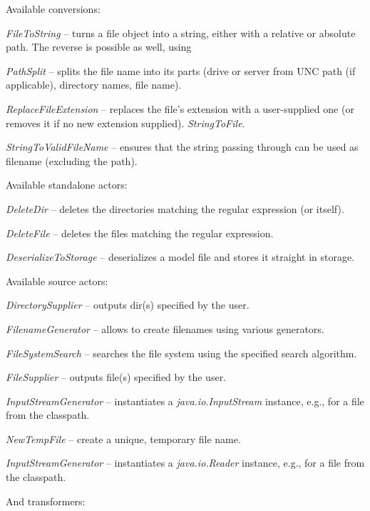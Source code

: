 Available conversions:
\begin{tight_itemize}
	\item \textit{FileToString} -- turns a file object into a string, either with a 
	relative or absolute path. The reverse is possible as well, using
	\item \textit{PathSplit} -- splits the file name into its parts (drive or
	server from UNC path (if applicable), directory names, file name).
	\item \textit{ReplaceFileExtension} -- replaces the file's extension with
	a user-supplied one (or removes it if no new extension supplied).
	\textit{StringToFile}.
	\item \textit{StringToValidFileName} -- ensures that the string passing through can 
	be used as filename (excluding the path).
\end{tight_itemize}
Available standalone actors:
\begin{tight_itemize}
  \item \textit{DeleteDir} -- deletes the directories matching the regular expression (or itself).
  \item \textit{DeleteFile} -- deletes the files matching the regular expression.
	\item \textit{DeserializeToStorage} -- deserializes a model file and
	stores it straight in storage.
\end{tight_itemize}
Available source actors:
\begin{tight_itemize}
	\item \textit{DirectorySupplier} -- outputs dir(s) specified by the user.
	\item \textit{FilenameGenerator} -- allows to create filenames using various
	generators.
	\item \textit{FileSystemSearch} -- searches the file system using the
	specified search algorithm.
	\item \textit{FileSupplier} -- outputs file(s) specified by the user.
	\item \textit{InputStreamGenerator} -- instantiates a \textit{java.io.InputStream} instance,
	e.g., for a file from the classpath.
	\item \textit{NewTempFile} -- create a unique, temporary file name.
	\item \textit{InputStreamGenerator} -- instantiates a \textit{java.io.Reader} instance,
	e.g., for a file from the classpath.
\end{tight_itemize}
And transformers:
